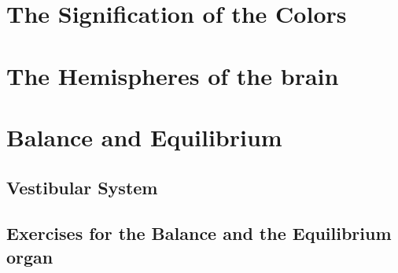 \documentclass[../main.tex]{subfiles}
\begin{document}




\chapter{The Signification of the Colors}



\chapter{The Hemispheres of the brain}



\chapter{Balance and Equilibrium}



\section{Vestibular System}



\section[Balance Exercises]{Exercises for the Balance and the Equilibrium organ}


\end{document}
